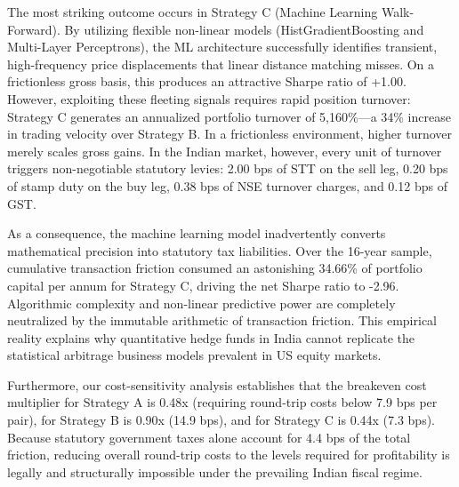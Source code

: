 The most striking outcome occurs in Strategy C (Machine Learning Walk-Forward). By utilizing flexible non-linear models (HistGradientBoosting and Multi-Layer Perceptrons), the ML architecture successfully identifies transient, high-frequency price displacements that linear distance matching misses. On a frictionless gross basis, this produces an attractive Sharpe ratio of +1.00. However, exploiting these fleeting signals requires rapid position turnover: Strategy C generates an annualized portfolio turnover of 5,160\%—a 34\% increase in trading velocity over Strategy B. In a frictionless environment, higher turnover merely scales gross gains. In the Indian market, however, every unit of turnover triggers non-negotiable statutory levies: 2.00 bps of STT on the sell leg, 0.20 bps of stamp duty on the buy leg, 0.38 bps of NSE turnover charges, and 0.12 bps of GST.

As a consequence, the machine learning model inadvertently converts mathematical precision into statutory tax liabilities. Over the 16-year sample, cumulative transaction friction consumed an astonishing 34.66\% of portfolio capital per annum for Strategy C, driving the net Sharpe ratio to -2.96. Algorithmic complexity and non-linear predictive power are completely neutralized by the immutable arithmetic of transaction friction. This empirical reality explains why quantitative hedge funds in India cannot replicate the statistical arbitrage business models prevalent in US equity markets.

Furthermore, our cost-sensitivity analysis establishes that the breakeven cost multiplier for Strategy A is 0.48x (requiring round-trip costs below 7.9 bps per pair), for Strategy B is 0.90x (14.9 bps), and for Strategy C is 0.44x (7.3 bps). Because statutory government taxes alone account for 4.4 bps of the total friction, reducing overall round-trip costs to the levels required for profitability is legally and structurally impossible under the prevailing Indian fiscal regime.

